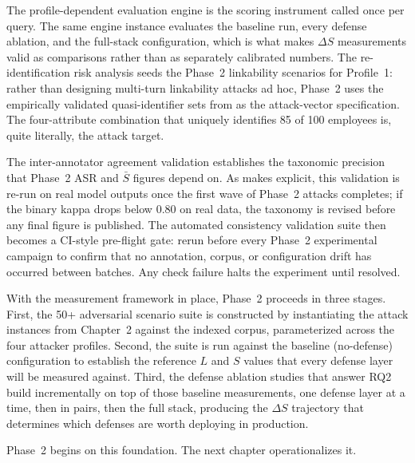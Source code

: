 \documentclass[12pt, a4paper]{report}
\begin{document}
The profile-dependent evaluation engine is the scoring instrument called once per query. The same engine instance evaluates the baseline run, every defense ablation, and the full-stack configuration, which is what makes $\Delta S$ measurements valid as comparisons rather than as separately calibrated numbers. The re-identification risk analysis seeds the Phase~2 linkability scenarios for Profile~1: rather than designing multi-turn linkability attacks ad hoc, Phase~2 uses the empirically validated quasi-identifier sets from  as the attack-vector specification. The four-attribute combination that uniquely identifies 85 of 100 employees is, quite literally, the attack target.

The inter-annotator agreement validation establishes the taxonomic precision that Phase~2 ASR and $\bar{S}$ figures depend on. As  makes explicit, this validation is re-run on real model outputs once the first wave of Phase~2 attacks completes; if the binary kappa drops below 0.80 on real data, the taxonomy is revised before any final figure is published. The automated consistency validation suite then becomes a CI-style pre-flight gate: rerun before every Phase~2 experimental campaign to confirm that no annotation, corpus, or configuration drift has occurred between batches. Any check failure halts the experiment until resolved.

With the measurement framework in place, Phase~2 proceeds in three stages. First, the 50+ adversarial scenario suite is constructed by instantiating the attack instances from Chapter~2 against the indexed corpus, parameterized across the four attacker profiles. Second, the suite is run against the baseline (no-defense) configuration to establish the reference $L$ and $S$ values that every defense layer will be measured against. Third, the defense ablation studies that answer RQ2 build incrementally on top of those baseline measurements, one defense layer at a time, then in pairs, then the full stack, producing the $\Delta S$ trajectory that determines which defenses are worth deploying in production.

Phase~2 begins on this foundation. The next chapter operationalizes it.
\end{document}

